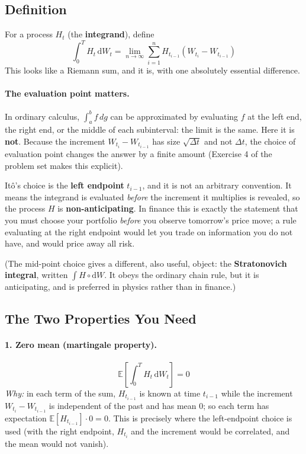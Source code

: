 \documentclass[]{article}
\newcommand{\E}{\mathbb{E}}
\newcommand{\Ito}{It\^{o}}
\newcommand{\dd}{\mathrm{d}}
\begin{document}
	\subsection{Definition}

	For a process $H_t$ (the \textbf{integrand}), define
	$$
	\int_0^T H_t \, \dd W_t = \lim_{n \to \infty} \sum_{i=1}^{n} H_{t_{i-1}} \left(W_{t_i} - W_{t_{i-1}}\right)
	$$
	This looks like a Riemann sum, and it is, with one absolutely essential difference.

	\paragraph{The evaluation point matters.}
	In ordinary calculus, $\int_a^b f \, dg$ can be approximated by evaluating $f$ at the left end, the right end, or the middle of each subinterval: the limit is the same.
	Here it is \textbf{not}.
	Because the increment $W_{t_i} - W_{t_{i-1}}$ has size $\sqrt{\Delta t}$ and not $\Delta t$, the choice of evaluation point changes the answer by a finite amount (Exercise 4 of the problem set makes this explicit).

	\Ito's choice is the \textbf{left endpoint} $t_{i-1}$, and it is not an arbitrary convention.
	It means the integrand is evaluated \textit{before} the increment it multiplies is revealed, so the process $H$ is \textbf{non-anticipating}.
	In finance this is exactly the statement that you must choose your portfolio \textit{before} you observe tomorrow's price move; a rule evaluating at the right endpoint would let you trade on information you do not have, and would price away all risk.

	(The mid-point choice gives a different, also useful, object: the \textbf{Stratonovich integral}, written $\int H \circ \dd W$. It obeys the ordinary chain rule, but it is anticipating, and is preferred in physics rather than in finance.)

	\subsection{The Two Properties You Need}

	\paragraph{1. Zero mean (martingale property).}
	$$
	\E\left[\int_0^T H_t \, \dd W_t\right] = 0
	$$
	\textit{Why:} in each term of the sum, $H_{t_{i-1}}$ is known at time $t_{i-1}$ while the increment $W_{t_i} - W_{t_{i-1}}$ is independent of the past and has mean $0$; so each term has expectation $\E[H_{t_{i-1}}] \cdot 0 = 0$.
	This is precisely where the left-endpoint choice is used (with the right endpoint, $H_{t_i}$ and the increment would be correlated, and the mean would not vanish).
\end{document}
